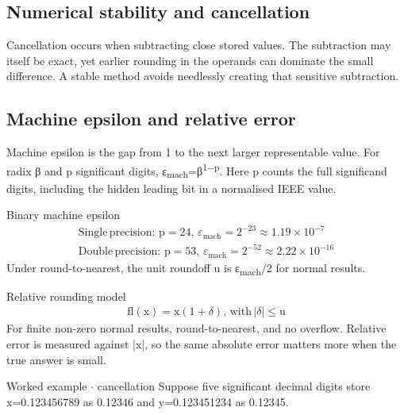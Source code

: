 \documentclass[11pt]{article}
\begin{document}
\begin{keepsection}
\begin{keepsection}
\subsection{Numerical stability and cancellation}

Cancellation occurs when subtracting close stored values. The subtraction may itself be exact, yet earlier rounding in the operands can dominate the small difference. A stable method avoids needlessly creating that sensitive subtraction.
\end{keepsection}

\begin{keepsection}
\subsection{Machine epsilon and relative error}

Machine epsilon is the gap from 1 to the next larger representable value. For radix β and p significant digits, ε\textsubscript{mach}=β\textsuperscript{1\ensuremath{-}p}. Here p counts the full significand digits, including the hidden leading bit in a normalised IEEE value.

\begin{equationcard}{Binary machine epsilon}
\[ \begin{gathered} \text{Single}\, \text{precision}:\, \mathrm{p}=24,\, ε_{\text{mach}}=2^{-23}\approx 1.19\times 10^{-7} \\ \text{Double}\, \text{precision}:\, \mathrm{p}=53,\, ε_{\text{mach}}=2^{-52}\approx 2.22\times 10^{-16} \end{gathered} \]
{\small Under round-to-nearest, the unit roundoff u is ε\textsubscript{mach}/2 for normal results.}
\end{equationcard}

\begin{equationcard}{Relative rounding model}
\[ \begin{gathered} \text{fl}(\mathrm{x})=\mathrm{x}(1+δ),\, \text{with}\, |δ|\leq \mathrm{u} \end{gathered} \]
{\small For finite non-zero normal results, round-to-nearest, and no overflow. Relative error is measured against |x|, so the same absolute error matters more when the true answer is small.}
\end{equationcard}

\begin{workedbox}{Worked example \ensuremath{\cdot} cancellation}
Suppose five significant decimal digits store x=0.123456789 as 0.12346 and y=0.123451234 as 0.12345.


\end{workedbox}
\end{keepsection}
\end{keepsection}
\end{document}
